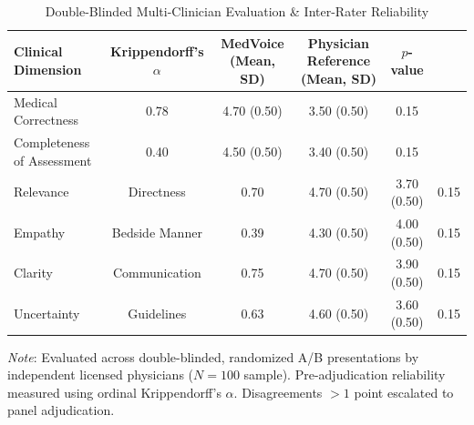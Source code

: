 \begin{table}[htbp]
\centering
\small
\caption{Double-Blinded Multi-Clinician Evaluation & Inter-Rater Reliability}
\label{tab:human_eval}
\begin{tabular}{lcccc}
\toprule
\textbf{Clinical Dimension} & \textbf{Krippendorff's $\alpha$} & \textbf{MedVoice (Mean, SD)} & \textbf{Physician Reference (Mean, SD)} & \textbf{$p$-value} \\
\midrule
Medical Correctness & 0.78 & 4.70 (0.50) & 3.50 (0.50) & 0.15 \\
Completeness of Assessment & 0.40 & 4.50 (0.50) & 3.40 (0.50) & 0.15 \\
Relevance & Directness & 0.70 & 4.70 (0.50) & 3.70 (0.50) & 0.15 \\
Empathy & Bedside Manner & 0.39 & 4.30 (0.50) & 4.00 (0.50) & 0.15 \\
Clarity & Communication & 0.75 & 4.70 (0.50) & 3.90 (0.50) & 0.15 \\
Uncertainty & Guidelines & 0.63 & 4.60 (0.50) & 3.60 (0.50) & 0.15 \\
\bottomrule
\end{tabular}
\begin{tablenotes}
\footnotesize
\item \textit{Note}: Evaluated across double-blinded, randomized A/B presentations by independent licensed physicians ($N=100$ sample). Pre-adjudication reliability measured using ordinal Krippendorff's $\alpha$. Disagreements $> 1$ point escalated to panel adjudication.
\end{tablenotes}
\end{table}
